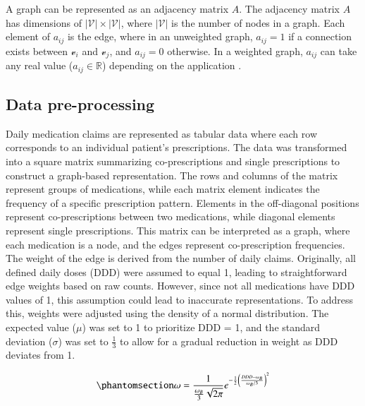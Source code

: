 \documentclass[
  authoryear,
  review]{elsarticle}
\begin{document}
A graph can be represented as an adjacency matrix \(A\). The adjacency
matrix \(A\) has dimensions of \(|\mathcal{V}| \times |\mathcal{V}|\),
where \(|\mathcal{V}|\) is the number of nodes in a graph. Each element
of \(a_{ij}\) is the edge, where in an unweighted graph, \(a_{ij} = 1\)
if a connection exists between \(\mathcal{v}_i\) and \(\mathcal{v}_j\),
and \(a_{ij} = 0\) otherwise. In a weighted graph, \(a_{ij}\) can take
any real value (\(a_{ij} \in \mathbb{R}\)) depending on the application
\citep{estrada2012structure}.

\subsection{Data pre-processing}\label{data-pre-processing}

Daily medication claims are represented as tabular data where each row
corresponds to an individual patient's prescriptions. The data was
transformed into a square matrix summarizing co-prescriptions and single
prescriptions to construct a graph-based representation. The rows and
columns of the matrix represent groups of medications, while each matrix
element indicates the frequency of a specific prescription pattern.
Elements in the off-diagonal positions represent co-prescriptions
between two medications, while diagonal elements represent single
prescriptions. This matrix can be interpreted as a graph, where each
medication is a node, and the edges represent co-prescription
frequencies. The weight of the edge is derived from the number of daily
claims. Originally, all defined daily doses (DDD) were assumed to equal
1, leading to straightforward edge weights based on raw counts. However,
since not all medications have DDD values of 1, this assumption could
lead to inaccurate representations. To address this, weights were
adjusted using the density of a normal distribution. The expected value
(\(\mu\)) was set to 1 to prioritize DDD = 1, and the standard deviation
(\(\sigma\)) was set to \(\frac{1}{3}\) to allow for a gradual reduction
in weight as DDD deviates from 1.

\begin{equation}\phantomsection\label{eq-weighted-DDD}{\omega = \frac{1}{\frac{\omega_B}{3} \sqrt{2 \pi}} e^{-\frac{1}{2}\left(\frac{DDD - \omega_B}{\omega_B/3}\right)^2}}\end{equation}
\end{document}
